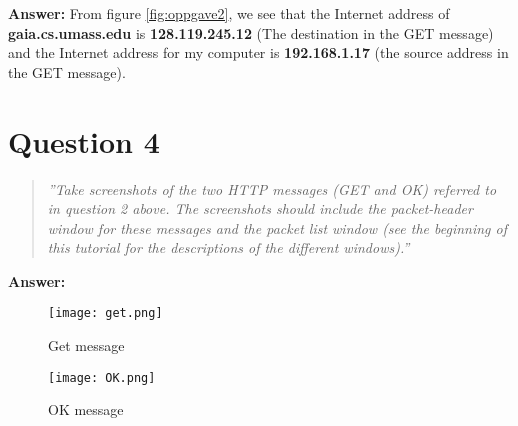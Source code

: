 \documentclass[12pt,a4paper]{article}
\begin{document}
			\textbf{Answer: } From figure \ref{fig:oppgave2}, we see that the Internet address of \textbf{gaia.cs.umass.edu} is \textbf{128.119.245.12} (The 							destination in the GET message) and the Internet address for my computer is \textbf{192.168.1.17} (the source address in the GET message).
			
			\section{Question 4}
				\begin{quote}
					\textit{
						''Take screenshots of the two HTTP messages (GET and OK) referred to in
						question 2 above. The screenshots should include the packet-header window for
						these messages and the packet list window (see the beginning of this tutorial for
						the descriptions of the different windows).''					
					}
				\end{quote}
				
				\textbf{Answer: } 
				\begin{figure}[hb!]
					\centering
					\texttt{[image: get.png]}
					\caption{Get message}
					\label{fig:get_message}
				\end{figure}
				
				\begin{figure}[hb!]
					\centering
					\texttt{[image: OK.png]}
					\caption{OK message}
					\label{fig:OK_message}
				\end{figure}
\end{document}
